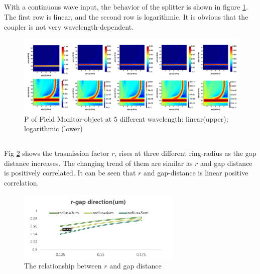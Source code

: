 \documentclass[fontsize=11pt]{scrartcl}
\begin{document}
\subsection{}
With a continuous wave input,
the behavior of the splitter is shown in figure \ref{fig2.2}.
The first row is linear,
and the second row is logarithmic.
It is obvious that the coupler is not very wavelength-dependent.
\begin{figure}[H]
    \centering
     \includegraphics[width=1\textwidth]{img/fig2.2.png}
     \caption{P of Field Monitor-object at 5 different wavelength: linear(upper); logarithmic (lower)}
     \label{fig2.2}
\end{figure} 
\subsection{}
Fig \ref{fig2.3} shows the trasmission factor $r$, rises at three different ring-radius 
as the gap distance increases. The changing trend of them are similar 
as $r$ and gap distance is positively correlated. It can be seen that 
$r$ and gap-distance is linear positive correlation.
\begin{figure}[H]
    \centering
     \includegraphics[width=0.7\textwidth]{img/fig2.3.png}
     \caption{The relationship between $r$ and gap distance}
     \label{fig2.3}
\end{figure} 
\pagebreak
\end{document}
